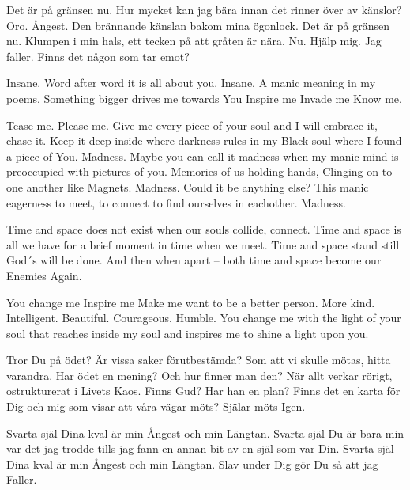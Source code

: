 \startpoem
Det är på gränsen nu.
Hur mycket kan jag bära
innan det rinner över av känslor?
Oro.
Ångest.
Den brännande känslan
bakom mina ögonlock.
Det är på gränsen nu.
Klumpen i min hals,
ett tecken på att gråten är nära.
Nu.
Hjälp mig.
Jag faller.
Finns det någon som 
tar emot?
\stoppoem

\startpoem
Insane.
Word after word
it is all about you.
Insane.
A manic meaning
in my poems.
Something bigger
drives me towards
You
Inspire me
Invade me
Know me.
\stoppoem

\startpoem
Tease me.
Please me.
Give me every piece of your soul
and I will embrace it,
chase it.
Keep it deep inside
where darkness rules in my
Black soul 
where I found a piece of
You.
Madness.
Maybe you can call it madness
when my manic mind is preoccupied with
pictures of you.
Memories of us holding hands,
Clinging on to one another like
Magnets.
Madness.
Could it be anything else?
This manic eagerness to meet,
to connect
to find ourselves in eachother.
Madness.
\stoppoem

\startpoem
Time and space
does not exist
when our souls collide,
connect.
Time and space
is all we have
for a brief moment in time
when we meet.
Time and space
stand still
God´s will be done.
And then
when apart – 
both time and space
become our
Enemies
Again.
\stoppoem

\startpoem
You change me
Inspire me
Make me want to be a better person.
More kind.
Intelligent.
Beautiful.
Courageous.
Humble.
You change me
with the light of 
your soul
that reaches inside
my soul and 
inspires me
to shine a light 
upon you.
\stoppoem

\startpoem
Tror Du på ödet?
Är vissa saker förutbestämda?
Som att vi skulle mötas,
hitta varandra.
Har ödet en mening?
Och hur finner man den?
När allt verkar rörigt,
ostrukturerat i Livets Kaos.
Finns Gud? Har han en plan?
Finns det en karta för Dig och mig 
som visar att våra vägar möts?
Själar möts 
Igen.
\stoppoem

\startpoem
Svarta själ
Dina kval är min
Ångest och min 
Längtan.
Svarta själ
Du är bara min
var det jag trodde
tills jag fann en annan bit av en själ
som var Din.
Svarta själ
Dina kval är min 
Ångest och min
Längtan.
Slav under Dig
gör Du så att jag 
Faller.
\stoppoem

